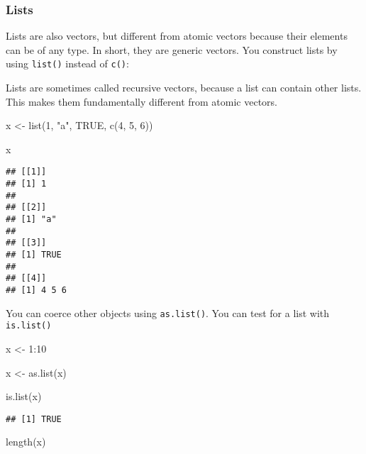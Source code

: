 \documentclass[
]{book}
\newenvironment{Shaded}{\begin{snugshade}}{\end{snugshade}}
\newcommand{\ConstantTok}[1]{\textcolor[rgb]{0.00,0.00,0.00}{#1}}
\newcommand{\DecValTok}[1]{\textcolor[rgb]{0.00,0.00,0.81}{#1}}
\newcommand{\FunctionTok}[1]{\textcolor[rgb]{0.00,0.00,0.00}{#1}}
\newcommand{\NormalTok}[1]{#1}
\newcommand{\OtherTok}[1]{\textcolor[rgb]{0.56,0.35,0.01}{#1}}
\newcommand{\SpecialCharTok}[1]{\textcolor[rgb]{0.00,0.00,0.00}{#1}}
\newcommand{\StringTok}[1]{\textcolor[rgb]{0.31,0.60,0.02}{#1}}
\begin{document}
\hypertarget{lists}{%
\subsubsection{Lists}\label{lists}}

Lists are also vectors, but different from atomic vectors because their elements can be of any type. In short, they are generic vectors. You construct lists by using \texttt{list()} instead of \texttt{c()}:

Lists are sometimes called recursive vectors, because a list can contain other lists. This makes them fundamentally different from atomic vectors.

\begin{Shaded}
\begin{Highlighting}[]
\NormalTok{x }\OtherTok{\textless{}{-}} \FunctionTok{list}\NormalTok{(}\DecValTok{1}\NormalTok{, }\StringTok{"a"}\NormalTok{, }\ConstantTok{TRUE}\NormalTok{, }\FunctionTok{c}\NormalTok{(}\DecValTok{4}\NormalTok{, }\DecValTok{5}\NormalTok{, }\DecValTok{6}\NormalTok{))}

\NormalTok{x}
\end{Highlighting}
\end{Shaded}

\begin{verbatim}
## [[1]]
## [1] 1
## 
## [[2]]
## [1] "a"
## 
## [[3]]
## [1] TRUE
## 
## [[4]]
## [1] 4 5 6
\end{verbatim}

You can coerce other objects using \texttt{as.list()}. You can test for a list with \texttt{is.list()}

\begin{Shaded}
\begin{Highlighting}[]
\NormalTok{x }\OtherTok{\textless{}{-}} \DecValTok{1}\SpecialCharTok{:}\DecValTok{10}

\NormalTok{x }\OtherTok{\textless{}{-}} \FunctionTok{as.list}\NormalTok{(x)}

\FunctionTok{is.list}\NormalTok{(x)}
\end{Highlighting}
\end{Shaded}

\begin{verbatim}
## [1] TRUE
\end{verbatim}

\begin{Shaded}
\begin{Highlighting}[]
\FunctionTok{length}\NormalTok{(x)}
\end{Highlighting}
\end{Shaded}
\end{document}
